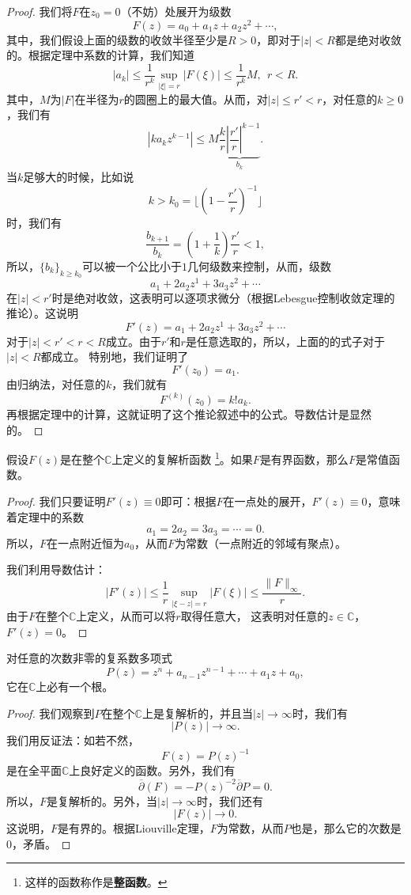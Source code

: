 \begin{proof}
我们将$F$在$z_0=0$（不妨）处展开为级数
\[F(z)=a_0+a_1z+a_2z^2+\cdots,\]
其中，我们假设上面的级数的收敛半径至少是$R>0$，即对于$|z|<R$都是绝对收敛的。根据定理中系数的计算，我们知道
\begin{equation*}
|a_k|\leqslant \frac{1}{r^k}\sup_{|\xi|=r}|F(\xi)|\leqslant \frac{1}{r^k}M, \ \ r<R.
\end{equation*}
其中，$M$为$|F|$在半径为$r$的圆圈上的最大值。从而，对$|z|\leqslant r'<r$，对任意的$k\geqslant 0$，我们有
\[|ka_kz^{k-1}|\leqslant M\underbrace{\frac{k}{r}\left|\frac{r'}{r}\right|^{k-1}}_{b_k}.\]
当$k$足够大的时候，比如说
\[k>k_0=\lfloor\left(1-\frac{r'}{r}\right)^{-1}\rfloor\]
时，我们有
\[\frac{b_{k+1}}{b_k}= \left(1+\frac{1}{k}\right)\frac{r'}{r}<1,\]
所以，$\{b_k\}_{k\geqslant k_0}$可以被一个公比小于$1$几何级数来控制，从而，级数
\[a_1+2a_2z^{1}+3a_3z^2+\cdots\]
在$|z|<r'$时是绝对收敛，这表明可以逐项求微分（根据Lebesgue控制收敛定理的推论）。这说明
\begin{equation*}
F'(z)=a_1+2a_2z^{1}+3a_3z^2+\cdots
\end{equation*}
对于$|z|<r'<r<R$成立。由于$r'$和$r$是任意选取的，所以，上面的的式子对于$|z|<R$都成立。
特别地，我们证明了
\[F'(z_0)=a_1.\]
由归纳法，对任意的$k$，我们就有
\[F^{(k)}(z_0)=k!a_k.\]
再根据定理中的计算，这就证明了这个推论叙述中的公式。导数估计是显然的。
\end{proof}
\begin{theorem}[Liouville]
假设$F(z)$是在整个$\mathbb{C}$上定义的复解析函数
\footnote{这样的函数称作是\textbf{整函数}。}。如果$F$是有界函数，那么$F$是常值函数。
\end{theorem}
\begin{proof}
我们只要证明$F'(z)\equiv 0$即可：根据$F$在一点处的展开，$F'(z)\equiv 0$，意味着定理中的系数
\[a_1=2a_2=3a_3=\cdots =0.\]
所以，$F$在一点附近恒为$a_0$，从而$F$为常数（一点附近的邻域有聚点）。

我们利用导数估计：
\begin{equation*}
|F'(z)|\leqslant \frac{1}{r}\sup_{|\xi-z|=r}|F(\xi)|\leqslant  \frac{\|F\|_\infty}{r}.
\end{equation*}
由于$F$在整个$\mathbb{C}$上定义，从而可以将$r$取得任意大，
这表明对任意的$z\in \mathbb{C}$，$F'(z)=0$。
\end{proof}
\begin{corollary}[代数基本定理]
对任意的次数非零的复系数多项式
\[P(z)=z^n+a_{n-1}z^{n-1}+\cdots+a_1z+a_0,\]
它在$\mathbb{C}$上必有一个根。
\end{corollary}
\begin{proof}
我们观察到$P$在整个$\mathbb{C}$上是复解析的，并且当$|z|\rightarrow \infty$时，我们有
\[|P(z)|\rightarrow \infty.\]
我们用反证法：如若不然，
\[F(z)=P(z)^{-1}\]
是在全平面$\mathbb{C}$上良好定义的函数。另外，我们有
\[\overline{\partial}(F)=-P(z)^{-2}\overline{\partial}P=0.\]
所以，$F$是复解析的。另外，当$|z|\rightarrow \infty$时，我们还有
\[|F(z)|\rightarrow 0.\]
这说明，$F$是有界的。根据Liouville定理，$F$为常数，从而$P$也是，那么它的次数是$0$，矛盾。
\end{proof}

